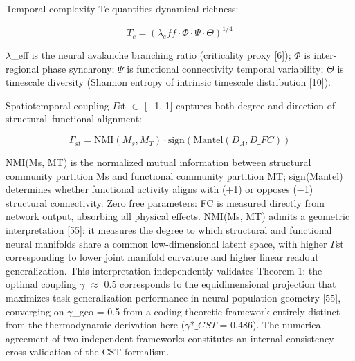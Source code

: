 \documentclass[a4paper,12pt]{article}
\begin{document}
Temporal complexity Tc quantifies dynamical richness:


\begin{equation}

T_c = (\lambda_eff \cdot \Phi \cdot \Psi \cdot \Theta)^{1/4} \tag{3}

\end{equation}


$\lambda$_eff is the neural avalanche branching ratio (criticality proxy [6]); $\Phi$ is inter-regional phase synchrony; $\Psi$ is functional connectivity temporal variability; $\Theta$ is timescale diversity (Shannon entropy of intrinsic timescale distribution [10]).


Spatiotemporal coupling $\Gamma$st $\in$ [−1, 1] captures both degree and direction of structural--functional alignment:


\begin{equation}

\Gamma_{st} = \text{NMI}(M_s, M_T) \cdot \text{sign}(\text{Mantel}(D_A, D\_{FC})) \tag{4}

\end{equation}


NMI(Ms, MT) is the normalized mutual information between structural community partition Ms and functional community partition MT; sign(Mantel) determines whether functional activity aligns with (+1) or opposes (−1) structural connectivity. Zero free parameters: FC is measured directly from network output, absorbing all physical effects. NMI(Ms, MT) admits a geometric interpretation [55]: it measures the degree to which structural and functional neural manifolds share a common low-dimensional latent space, with higher $\Gamma$st corresponding to lower joint manifold curvature and higher linear readout generalization. This interpretation independently validates Theorem 1: the optimal coupling $\gamma$ $\approx$ 0.5 corresponds to the equidimensional projection that maximizes task-generalization performance in neural population geometry [55], converging on $\gamma$_geo = 0.5 from a coding-theoretic framework entirely distinct from the thermodynamic derivation here ($\gamma$*$\_CST$ = 0.486). The numerical agreement of two independent frameworks constitutes an internal consistency cross-validation of the CST formalism.
\end{document}
